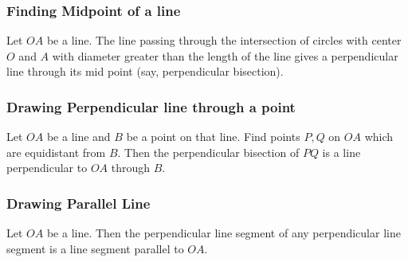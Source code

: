 \subsubsection{Finding Midpoint of a line}
	Let $OA$ be a line. The line passing through the intersection of circles with center $O$ and $A$ with diameter greater than the length of the line gives a perpendicular line through its mid point (say, perpendicular bisection).

\subsubsection{Drawing Perpendicular line through a point}
	Let $OA$ be a line and $B$ be a point on that line. Find points $P,Q$ on $OA$ which are equidistant from $B$. Then the perpendicular bisection of $PQ$ is a line perpendicular to $OA$ through $B$.
\subsubsection{Drawing Parallel Line} 
	Let $OA$ be a line. Then the perpendicular line segment of any perpendicular line segment is a line segment parallel to $OA$.

